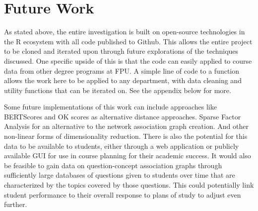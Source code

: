 %
%
%

\chapter{Future Work}

As stated above,  the entire investigation is built on open-source technologies in the R ecosystem with all code published 
to Github. This allows the entire project to be cloned and iterated upon through future explorations of the techniques 
discussed. One specific upside of this is that the code can easily applied to course data from other degree programs at FPU. A simple line of code to a function allows the work here to be applied to any department, with data cleaning and utility functions that can be iterated on. See the appendix below for more.

Some future implementations of this work can include approaches like BERTScores and OK scores as alternative distance 
approaches. Sparse Factor Analysis for an alternative to the network association graph creation. And other non-linear forms of dimensionality reduction.  There is also the potential for this data to be available to students, either through a web application or publicly available GUI for use in course planning for their academic success. 
It would also be feasible to gain data on question-concept association graphs \cite{willcox_network_2017} through sufficiently large databases of questions 
given to students over time that are characterized by the topics covered by those questions. This could potentially link student 
performance to their overall response to plans of study to adjust even further. 
